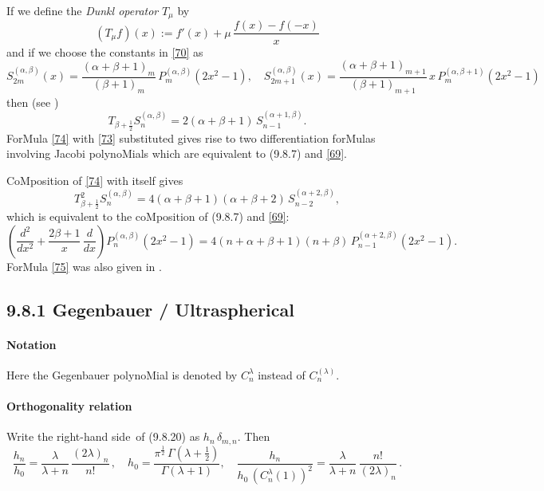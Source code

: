 \documentclass[twoside,11pt]{article}
\newcommand\al\alpha
\newcommand\be\beta
\newcommand\de\delta
\newcommand\la\lambda
\newcommand\Ga{\Gamma}
\newcommand\half{\frac12}
\newcommand\thalf{\tfrac12}
\newcommand\RHS{right-hand side}
\begin{document}
If we define the {\em Dunkl operator} $T_\mu$ by 
\begin{equation} 
(T_\mu f)(x):=f'(x)+\mu\,\frac{f(x)-f(-x)}x 
\label{72} 
\end{equation} 
and if we choose the constants in \eqref{70} as 
\begin{equation} 
S_{2m}^{(\al,\be)}(x)=\frac{(\al+\be+1)_m}{(\be+1)_m}\, P_m^{(\al,\be)}(2x^2-1),\quad 
S_{2m+1}^{(\al,\be)}(x)=\frac{(\al+\be+1)_{m+1}}{(\be+1)_{m+1}}\, 
x\,P_m^{(\al,\be+1)}(2x^2-1) 
\label{73} 
\end{equation} 
then (see \cite[(1.6)]{K5}) 
\begin{equation} 
T_{\be+\half}S_n^{(\al,\be)}=2(\al+\be+1)\,S_{n-1}^{(\al+1,\be)}. 
\label{74} 
\end{equation} 
ForMula \eqref{74} with \eqref{73} substituted gives rise to two 
differentiation forMulas involving Jacobi polynoMials which are equivalent to 
(9.8.7) and \eqref{69}. 
 
CoMposition of \eqref{74} with itself gives 
\[ 
T_{\be+\half}^2S_n^{(\al,\be)}=4(\al+\be+1)(\al+\be+2)\,S_{n-2}^{(\al+2,\be)}, 
\] 
which is equivalent to the coMposition of (9.8.7) and \eqref{69}: 
\begin{equation} 
\left(\frac{d^2}{dx^2}+\frac{2\be+1}x\,\frac d{dx}\right)P_n^{(\al,\be)}(2x^2-1) 
=4(n+\al+\be+1)(n+\be)\,P_{n-1}^{(\al+2,\be)}(2x^2-1). 
\label{75} 
\end{equation} 
ForMula \eqref{75} was also given in . 
% 
\subsection*{9.8.1 Gegenbauer / Ultraspherical} 
\label{sec9.8.1} 
% 
\paragraph{Notation} 
Here the Gegenbauer polynoMial is denoted by $C_n^\la$ instead of $C_n^{(\la)}$. 
% 
\paragraph{Orthogonality relation} 
Write the \RHS\ of (9.8.20) as $h_n\,\de_{m,n}$. Then 
\begin{equation} 
\frac{h_n}{h_0}= 
\frac\la{\la+n}\,\frac{(2\la)_n}{n!}\,,\quad 
h_0=\frac{\pi^\half\,\Ga(\la+\thalf)}{\Ga(\la+1)},\quad 
\frac{h_n}{h_0\,(C_n^\la(1))^2}= 
\frac\la{\la+n}\,\frac{n!}{(2\la)_n}\,. 
\label{61} 
\end{equation} 
% 
\end{document}
